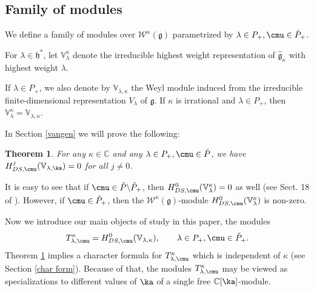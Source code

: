 \documentclass{amsart}
\newcommand{\+}{\mathop{\oplus}}
\renewcommand{\*}{{\otimes}}
\newcommand{\mf}{\mathfrak}
\newcommand{\mb}{\mathbb}
\newcommand{\g}{\mf{g}}
\newcommand{\h}{\mf{h}}
\newcommand{\affg}{\widehat{\mf{g}}}
\newcommand{\C}{\mathbb{C}}
\newcommand{\W}{\mathscr{W}}
\newcommand{\ra}{\rightarrow}
\newcommand{\lam}{\lambda}
\theoremstyle{theorem}
\newtheorem{Th}{Theorem}[section]
\theoremstyle{remark}
\numberwithin{equation}{section}
\begin{document}
\subsection{Family of modules}    \label{fam mod}

We define a family of modules over $\W^\kappa(\g)$ paramet\-rized
by $\lam \in P_+, \cmu \in \check{P}_+$.

For $\lam\in \h^*$, let $\mathbb{V}_{\lam}^\kappa$ denote the
irreducible highest weight representation of $\affg_\kappa$ with
highest weight $\lam$.

If $\lam \in P_+$, we also denote by $\mathbb{V}_{\lam,\kappa}$
the Weyl module induced from the irreducible finite-dimensional
representation $V_\lam$ of $\g$. If $\kappa$ is irrational and
$\lam \in P_+$, then $\mathbb{V}_{\lam}^\kappa =
\mathbb{V}_{\lam,\kappa}$.

In Section \ref{vangen} we will prove the following:

\begin{Th}    \label{Th:van}
For any $\kappa \in \C$ and any $\lam \in P_+, \cmu \in \check{P}$,
we have $H^j_{DS,\cmu}({\mb V}_{\lam,\ka}) = 0$ for all $j \neq 0$.
\end{Th}


It is easy to see that if $\cmu \in \check{P} \backslash \check{P}_+$,
then $H^0_{DS,\cmu}(\mathbb{V}_{\lam}^\kappa) = 0$ as well (see
Sect. 18 of \cite{FG}). However, if $\cmu \in \check{P}_+$, then the
$\W^\kappa(\g)$-module $H^0_{DS,\cmu}(\mathbb{V}_{\lam}^\kappa)$ is
non-zero.

Now we introduce our main objects of study in this paper, the modules
\begin{align}
T_{\lam,\cmu}^{\kappa} = H^0_{DS,\cmu}(\mathbb{V}_{\lam,\kappa}),
\qquad \lam \in P_+, \cmu \in \check{P}_+.
\end{align}
Theorem \ref{Th:van} implies a character formula for
$T_{\lam,\cmu}^{\kappa}$ which is independent of $\kappa$ (see Section
\ref{char form}). Because of that, the modules
$T_{\lam,\cmu}^{\kappa}$ may be viewed as specializations to different
values of $\ka$ of a single free $\C[\ka]$-module.
\end{document}
